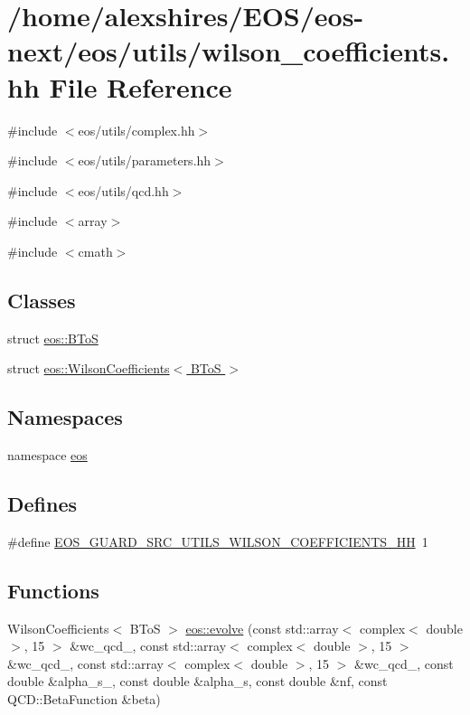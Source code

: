 \hypertarget{wilson__coefficients_8hh}{
\section{/home/alexshires/EOS/eos-\/next/eos/utils/wilson\_\-coefficients.hh File Reference}
\label{wilson__coefficients_8hh}
}
{\ttfamily \#include $<$eos/utils/complex.hh$>$}\par
{\ttfamily \#include $<$eos/utils/parameters.hh$>$}\par
{\ttfamily \#include $<$eos/utils/qcd.hh$>$}\par
{\ttfamily \#include $<$array$>$}\par
{\ttfamily \#include $<$cmath$>$}\par
\subsection*{Classes}
\begin{DoxyCompactItemize}
\item 
struct \hyperlink{structeos_1_1BToS}{eos::BToS}
\item 
struct \hyperlink{structeos_1_1WilsonCoefficients_3_01BToS_01_4}{eos::WilsonCoefficients$<$ BToS $>$}
\end{DoxyCompactItemize}
\subsection*{Namespaces}
\begin{DoxyCompactItemize}
\item 
namespace \hyperlink{namespaceeos}{eos}
\end{DoxyCompactItemize}
\subsection*{Defines}
\begin{DoxyCompactItemize}
\item 
\#define \hyperlink{wilson__coefficients_8hh_a89af6a6c983929d07b250c7b823741b8}{EOS\_\-GUARD\_\-SRC\_\-UTILS\_\-WILSON\_\-COEFFICIENTS\_\-HH}~1
\end{DoxyCompactItemize}
\subsection*{Functions}
\begin{DoxyCompactItemize}
\item 
WilsonCoefficients$<$ BToS $>$ \hyperlink{namespaceeos_a07bd8aab4adc1e31cfbd795b36f592ee}{eos::evolve} (const std::array$<$ complex$<$ double $>$, 15 $>$ \&wc\_\-qcd\_, const std::array$<$ complex$<$ double $>$, 15 $>$ \&wc\_\-qcd\_, const std::array$<$ complex$<$ double $>$, 15 $>$ \&wc\_\-qcd\_, const double \&alpha\_\-s\_, const double \&alpha\_\-s, const double \&nf, const QCD::BetaFunction \&beta)
\end{DoxyCompactItemize}


